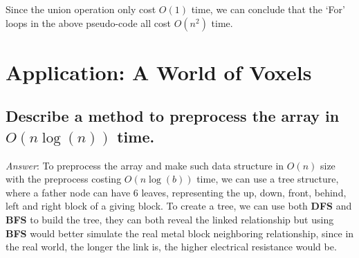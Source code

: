 \documentclass[11pt]{article}
\begin{document}
	Since the union operation only cost $O(1)$ time, we can conclude that the `For' loops in the above pseudo-code all cost $O(n^2)$ time.
\section{Application: A World of Voxels}
\subsection{Describe a method to preprocess the array in $O(n\log(n))$ time.} 
\noindent \emph{Answer}: To preprocess the array and make such data structure in $O(n)$ size with the preprocess costing $O(n\log(b))$ time, we can use a tree structure, where a father node can have $6$ leaves, representing the up, down, front, behind, left and right block of a giving block. To create a tree, we can use both \textbf{DFS} and \textbf{BFS} to build the tree, they can both reveal the linked relationship but using \textbf{BFS} would better simulate the real metal block neighboring relationship, since in the real world, the longer the link is, the higher electrical resistance would be.
\end{document}
